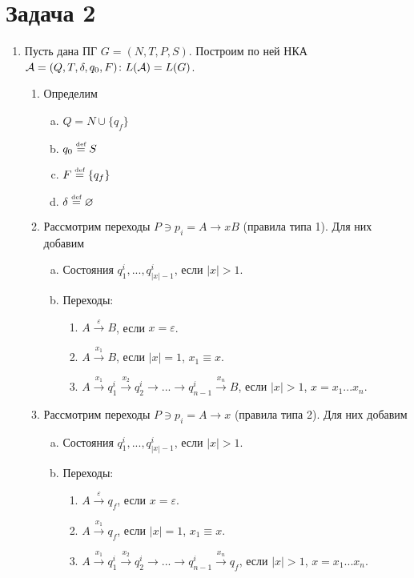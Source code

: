 \documentclass[a4paper]{article}
\def\A{{\cal A}}
\def\eqdef{\overset{\mbox{\tiny def}}{=}}
\begin{document}
\section*{Задача 2}
\begin{enumerate}
\item Пусть дана ПГ $G=(N,T,P,S)$. Построим по ней НКА $\A=(Q,T,\delta,q_0,F)\colon L(\A)=L(G)$.\begin{enumerate}[1.]
\item Определим \begin{enumerate}[a.]
\item $Q=N\cup\{q_f\}$
\item $q_0\eqdef S$
\item $F\eqdef\{q_f\}$
\item $\delta\eqdef\varnothing$
\end{enumerate}
\item Рассмотрим переходы $P\ni p_i=A\longrightarrow xB$ (правила типа 1). Для них добавим\begin{enumerate}[a.]
\item Состояния $q^i_1,...,q^i_{|x|-1}$, если $|x|>1$.
\item Переходы: \label{stepAB}\begin{enumerate}[1.]
\item $A\overset{\varepsilon}{\longrightarrow}B$, если $x=\varepsilon$.
\item $A\overset{x_1}{\longrightarrow}B$, если $|x|=1$, $x_1\equiv x$.
\item $A\overset{x_1}{\longrightarrow}q^i_1\overset{x_2}{\longrightarrow} q^i_2\longrightarrow...\longrightarrow q^i_{n-1}\overset{x_n}{\longrightarrow}B$, если $|x|>1$, $x=x_1...x_n$.
\end{enumerate}
\end{enumerate}
\item Рассмотрим переходы $P\ni p_i=A\longrightarrow x$ (правила типа 2). Для них добавим\begin{enumerate}[a.]
\item Состояния $q^i_1,...,q^i_{|x|-1}$, если $|x|>1$.
\item Переходы: \label{stepAqf}\begin{enumerate}[1.]
\item $A\overset{\varepsilon}{\longrightarrow}q_f$, если $x=\varepsilon$.
\item $A\overset{x_1}{\longrightarrow}q_f$, если $|x|=1$, $x_1\equiv x$.
\item $A\overset{x_1}{\longrightarrow}q^i_1\overset{x_2}{\longrightarrow} q^i_2\longrightarrow...\longrightarrow q^i_{n-1}\overset{x_n}{\longrightarrow}q_f$, если $|x|>1$, $x=x_1...x_n$.

\end{enumerate}
\end{enumerate}
\end{enumerate}
\end{enumerate}
\end{document}
